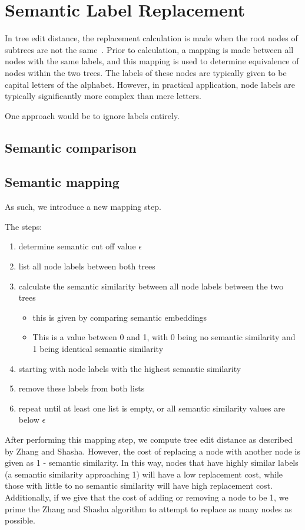 \section{Semantic Label Replacement}

In tree edit distance, the replacement calculation is made when the root nodes of subtrees are not the same~\cite{zhang_simple_1989}. Prior to calculation, a mapping is made between all nodes with the same labels, and this mapping is used to determine equivalence of nodes within the two trees. The labels of these nodes are typically given to be capital letters of the alphabet. However, in practical application, node labels are typically significantly more complex than mere letters.

One approach would be to ignore labels entirely.


\subsection{Semantic comparison}


\subsection{Semantic mapping}

As such, we introduce a new mapping step.

The steps:
\begin{enumerate}
    \item determine semantic cut off value $\epsilon$
    \item list all node labels between both trees
    \item calculate the semantic similarity between all node labels between the two trees
          \begin{itemize}
              \item this is given by comparing semantic embeddings
              \item This is a value between 0 and 1, with 0 being no semantic similarity and 1 being identical semantic similarity
          \end{itemize}
    \item starting with node labels with the highest semantic similarity
    \item remove these labels from both lists
    \item repeat until at least one list is empty, or all semantic similarity values are below $\epsilon$
\end{enumerate}

After performing this mapping step, we compute tree edit distance as described by Zhang and Shasha. However, the cost of replacing a node with another node is given as 1 - semantic similarity. In this way, nodes that have highly similar labels (a semantic similarity approaching 1) will have a low replacement cost, while those with little to no semantic similarity will have high replacement cost. Additionally, if we give that the cost of adding or removing a node to be 1, we prime the Zhang and Shasha algorithm to attempt to replace as many nodes as possible. 

